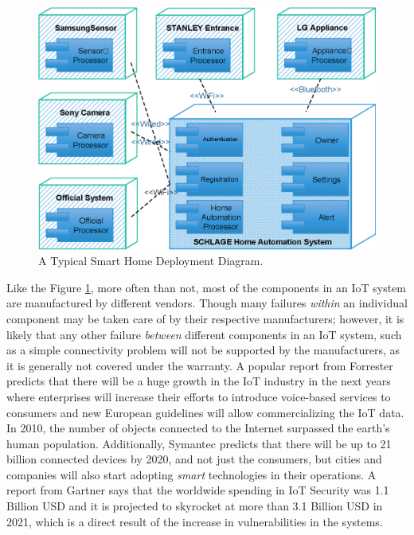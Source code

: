 \begin{figure}[h]
	\centering
	\includegraphics[width=\columnwidth]{images/shdd.eps}
	\caption{A Typical Smart Home Deployment Diagram.}
	\label{fig:SmartHomeDepDiagram}
\end{figure}

Like the Figure \ref{fig:SmartHomeDepDiagram}, more often than not, most of the components in an IoT system are manufactured by different vendors. Though many failures \textit{within} an individual component may be taken care of by their respective manufacturers; however, it is likely that any other failure \textit{between} different components in an IoT system, such as a simple connectivity problem will not be supported by the manufacturers, as it is generally not covered under the warranty. A popular report from Forrester\cite{Pelino2017} predicts that there will be a huge growth in the IoT industry in the next years where enterprises will increase their efforts to introduce voice-based services to consumers and new European guidelines will allow commercializing the IoT data. In 2010, the number of objects connected to the Internet surpassed the earth’s human population\cite{Al-fuqaha2015}. Additionally, Symantec\cite{Symantec} predicts that there will be up to 21 billion connected devices by 2020, and not just the consumers, but cities and companies will also start adopting \textit{smart} technologies in their operations. A report from Gartner\cite{Bamiduro2018} says that the worldwide spending in IoT Security was 1.1 Billion USD and it is projected to skyrocket at more than 3.1 Billion USD in 2021, which is a direct result of the increase in vulnerabilities in the systems.

